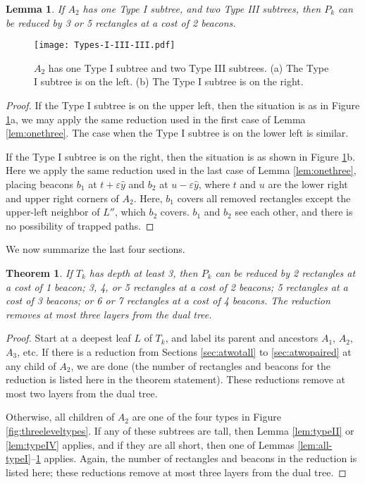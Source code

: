 \documentclass{article}
\newtheorem{thm}{Theorem}[section]
\newtheorem{lemma}{Lemma}
\begin{document}
		
		\begin{lemma}\label{lem:onethreethree}
			If $A_2$ has one Type I subtree, and two Type III subtrees,
			then $P_k$ can be reduced by 3 or 5 rectangles at a cost of 2 beacons.
		\end{lemma}
		\begin{figure}[htbp] 
			\begin{center}
				\texttt{[image: Types-I-III-III.pdf]} 
			\end{center}
			\caption{ $A_2$ has one Type I subtree and two Type III subtrees.
					  (a) The Type I subtree is on the left.
					  (b) The Type I subtree is on the right.
					}
			\label{fig:onethreethree}
		\end{figure}  
		
		\begin{proof}
			If the Type I subtree is on the upper left, then the situation is
			as in Figure \ref{fig:onethreethree}a, we may
			apply the same reduction used in the first case of Lemma \ref{lem:onethree}.
			The case when the Type I subtree is on the lower left is similar.
			
			If the Type I subtree is on the right, then the situation is as shown
			in Figure \ref{fig:onethreethree}b.
			Here we apply the same reduction used in the last case of Lemma
			\ref{lem:onethree}, placing beacons $b_1$ at $t + \varepsilon\hat{y}$ and
			$b_2$ at $u - \varepsilon\hat{y}$, where $t$ and $u$ are the lower right and
			upper right corners of $A_2$.
			Here, $b_1$ covers all removed rectangles except the
			upper-left neighbor of $L''$, which $b_2$ covers.
			$b_1$ and $b_2$ see each other, and there is no possibility of trapped paths.
		\end{proof}
	
		We now summarize the last four sections.
		
		\begin{thm}\label{thm:casesummary}
			If $T_k$ has depth at least 3, then $P_k$ can be reduced by 2 rectangles at a
			cost of 1 beacon; 3, 4, or 5 rectangles at a cost of 2 beacons;  5 rectangles
			at a cost of 3 beacons; or 6 or 7 rectangles at a cost of 4 beacons.
			The reduction removes at most three layers from the dual tree.
		\end{thm}
		\begin{proof}
			Start at a deepest leaf $L$ of $T_k$, and label its parent and ancestors
			$A_1$, $A_2$, $A_3$, etc.  If there is a reduction from Sections
			\ref{sec:atwotall} to \ref{sec:atwopaired} at any child of $A_2$,
			we are done (the number of rectangles and beacons for the reduction is
			listed here in the theorem statement).  These reductions remove at most two
			layers from the dual tree.
			
			Otherwise, all children of $A_2$ are one of the four types in Figure
			\ref{fig:threeleveltypes}.
			If any of these subtrees are tall, then Lemma \ref{lem:typeII} or
			\ref{lem:typeIV} applies, and if they are all short, then one of Lemmas
			\ref{lem:all-typeI}--\ref{lem:onethreethree} applies.
			Again, the number of rectangles and beacons in the reduction is listed here;
			these reductions remove at most three layers from the dual tree.
		\end{proof}
		
\end{document}
